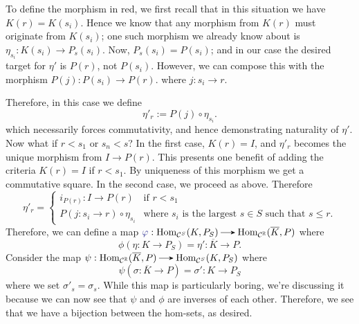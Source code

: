 To define the morphism in red, we first recall that in 
this situation we have $K(r) = K(s_i)$. Hence we know that any morphism  
from $K(r)$ must originate from $K(s_i)$; one such morphism we already know 
about is $\eta_{s_i}: K(s_i) \to P_s(s_i)$. Now, $P_s(s_i) = P(s_i)$; 
and in our case the desired target for $\eta'$ is $P(r)$, not $P(s_i)$. However, 
we can compose this with the morphism $P(j): P(s_i)  \to P(r)$.
where $j : s_i \to r$.
\begin{center}
\end{center}
Therefore, in this case we define 
\[
    \eta'_{r} := P(j) \circ \eta_{s_i}.
\]
which necessarily forces commutativity, and hence demonstrating 
naturality of $\eta'$. Now what if $r < s_1$ or $s_n < s$? In the first case, 
$K(r) = I$, and $\eta'_r$ becomes the unique morphism from $I \to P(r)$. 
\textcolor{NavyBlue}{This presents one benefit of adding the criteria 
$K(r) = I$ if $r < s_1$}.
By uniqueness of this morphism we get a commutative square. 
In the second case, we proceed as above. Therefore 
\[
    \eta'_r = 
    \begin{cases}
        i_{P(r)}: I \to P(r) & \text{if } r < s_1\\
        P(j: s_i \to r) \circ \eta_{s_i} & \text{where } s_i \text{ is the largest } s \in S \text{ such that } s \le r. 
    \end{cases}
\]
Therefore, we can define a map $\textcolor{Blue}{\phi}: \hom_{\cc^S}(K,P_S) \to \hom_{\cc^{\rr}}(\overline{K}, P)$ 
where
\[
    \phi(\eta: K \to P_S) = \eta': \overline{K} \to P.
\] 
Consider the map $\psi: \hom_{\cc^{\rr}}(\overline{K}, P) \to \hom_{\cc^S}(K, P_S)$
where 
\[
    \psi(\sigma: \overline{K} \to P) = \sigma': K \to P_S
\]
where we set $\sigma'_s = \sigma_s$. While this map is particularly boring, 
we're discussing it because we can now see that $\psi$ and $\phi$ are inverses of 
each other. Therefore, we see that we have a bijection between the hom-sets,  as desired. 

